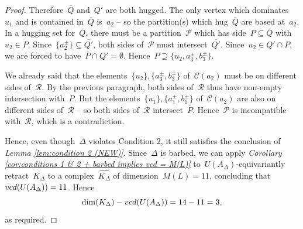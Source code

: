 \documentclass[11pt]{amsart}
\theoremstyle{definition}
\theoremstyle{definition}
\theoremstyle{definition}
\theoremstyle{definition}
\newcommand{\calC}{\mathcal{C}}
\newcommand{\calP}{\mathcal{P}} %
\newcommand{\calR}{\mathcal{R}} %
\begin{document}
\begin{proof}
    Therefore~$\overline{Q}$ and~$\overline{Q'}$ are both hugged. The only vertex which dominates~$u_1$ and is contained in~$\overline{Q}$ is~$a_2$ -- so the partition(s) which hug~$\overline{Q}$ are based at~$a_2$. In a hugging set for~$\overline{Q}$, there must be a partition~$\calP$ which has side~$P \subseteq \overline{Q}$ with~$u_2 \in P$. Since~$\{a_2^\pm\} \subseteq \overline{Q'}$, both sides of~$\calP$ must intersect~$\overline{Q'}$. Since~$u_2 \in Q' \cap P$, we are forced to have~$\overline{P} \cap Q' = \emptyset$. Hence~$P \supseteq \{u_2, a_3^\pm, b_3^\pm\}$. 

    We already said that the elements~$\{u_2\}, \{a_3^\pm, b_3^\pm\}$ of~$\calC(a_2)$ must be on different sides of~$\calR$. By the previous paragraph, both sides of~$\calR$ thus have non-empty intersection with~$P$. But the elements~$\{u_1\}, \{a_1^\pm, b_1^\pm\}$ of~$\calC(a_2)$ are also on different sides of~$\calR$ -- so both sides of~$\calR$ intersect~$\overline{P}$. Hence~$\calP$ is incompatible with~$\calR$, which is a contradiction. 

    Hence, even though~$\Delta$ violates Condition 2, it still satisfies the conclusion of \emph{Lemma \ref{lem:condition 2 (NEW)}}. Since~$\Delta$ is barbed, we can apply \emph{Corollary \ref{cor:conditions 1 & 2 + barbed implies vcd = M(L)}} to~$U(A_\Delta)$-equivariantly retract~$K_\Delta$ to a complex~$\widehat{K_\Delta}$ of dimension~$M(L) = 11$, concluding that~$\textsc{vcd}(U(A_\Delta)) = 11$. Hence \[\dim(K_\Delta) - \textsc{vcd}(U(A_\Delta)) = 14 - 11 = 3,\] as required. 
\end{proof}


\footnotesize

\medskip
\end{document}
